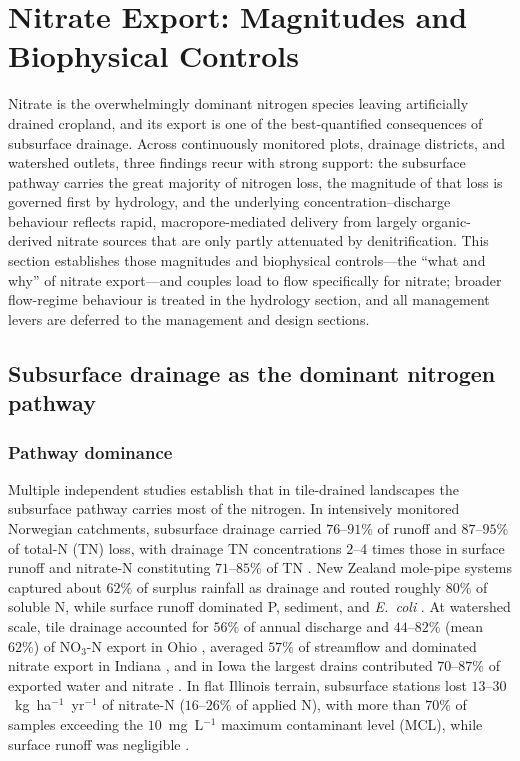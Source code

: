 \section{Nitrate Export: Magnitudes and Biophysical Controls}

Nitrate is the overwhelmingly dominant nitrogen species leaving artificially
drained cropland, and its export is one of the best-quantified consequences of
subsurface drainage. Across continuously monitored plots, drainage districts,
and watershed outlets, three findings recur with strong support: the
subsurface pathway carries the great majority of nitrogen loss, the magnitude
of that loss is governed first by hydrology, and the underlying
concentration--discharge behaviour reflects rapid, macropore-mediated delivery
from largely organic-derived nitrate sources that are only partly attenuated by
denitrification. This section establishes those magnitudes and biophysical
controls---the ``what and why'' of nitrate export---and couples load to flow
specifically for nitrate; broader flow-regime behaviour is treated in the
hydrology section, and all management levers are deferred to the management and
design sections.

\subsection{Subsurface drainage as the dominant nitrogen pathway}

\subsubsection{Pathway dominance}

Multiple independent studies establish that in tile-drained landscapes the
subsurface pathway carries most of the nitrogen. In intensively monitored
Norwegian catchments, subsurface drainage carried $76$--$91\%$ of runoff and
$87$--$95\%$ of total-N (TN) loss, with drainage TN concentrations $2$--$4$
times those in surface runoff and nitrate-N constituting $71$--$85\%$ of TN
\parencite{Bechmann2014}. New Zealand mole-pipe systems captured about $62\%$
of surplus rainfall as drainage and routed roughly $80\%$ of soluble N, while
surface runoff dominated P, sediment, and \emph{E.\ coli}
\parencite{Monaghan2016}. At watershed scale, tile drainage accounted for
$56\%$ of annual discharge and $44$--$82\%$ (mean $62\%$) of NO$_3$-N export in
Ohio \parencite{Williams2015}, averaged $57\%$ of streamflow and dominated
nitrate export in Indiana \parencite{Grose2022}, and in Iowa the largest drains
contributed $70$--$87\%$ of exported water and nitrate \parencite{Coupe2020}.
In flat Illinois terrain, subsurface stations lost
$13$--$30$~kg~ha$^{-1}$~yr$^{-1}$ of nitrate-N ($16$--$26\%$ of applied N), with
more than $70\%$ of samples exceeding the $10$~mg~L$^{-1}$ maximum contaminant
level (MCL), while surface runoff was negligible \parencite{Dattamudi2020}.

